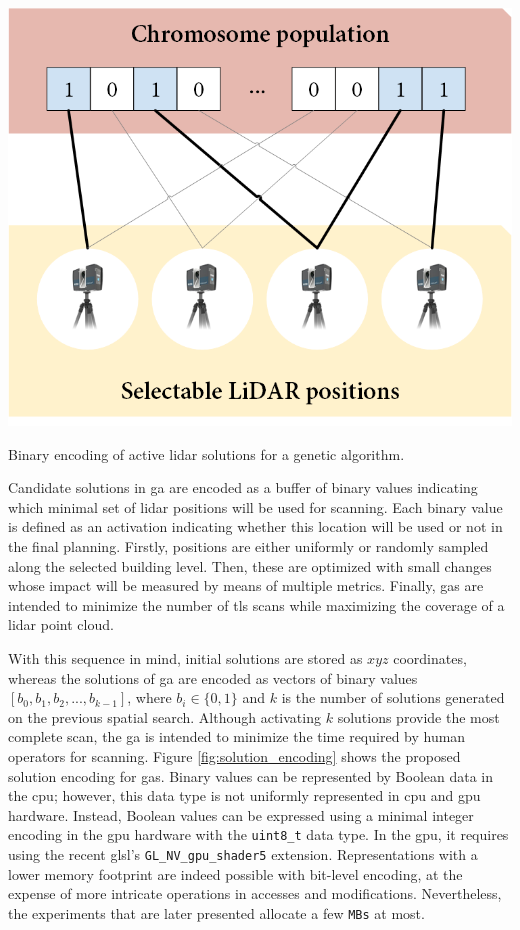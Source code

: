 \begin{marginfigure}[-2.0cm]
    \centering
    \includegraphics[width=\linewidth]{figs/lidar_optimization/solution_encoding.png}
	\caption{Binary encoding of active \acrshort{lidar} solutions for a genetic algorithm.}
	\label{fig:solution_encoding}
\end{marginfigure}
Candidate solutions in \acrshort{ga} are encoded as a buffer of binary values indicating which minimal set of \acrshort{lidar} positions will be used for scanning. Each binary value is defined as an activation indicating whether this location will be used or not in the final planning. Firstly, positions are either uniformly or randomly sampled along the selected building level. Then, these are optimized with small changes whose impact will be measured by means of multiple metrics. Finally, \acrshort{ga}s are intended to minimize the number of \acrshort{tls} scans while maximizing the coverage of a \acrshort{lidar} point cloud.

With this sequence in mind, initial solutions are stored as $xyz$ coordinates, whereas the solutions of \acrshort{ga} are encoded as vectors of binary values $[b_0, b_1, b_2, ..., b_{k-1}]$, where $b_i \in \{0, 1\}$ and $k$ is the number of solutions generated on the previous spatial search. Although activating $k$ solutions provide the most complete scan, the \acrshort{ga} is intended to minimize the time required by human operators for scanning. Figure \ref{fig:solution_encoding} shows the proposed solution encoding for \acrshort{ga}s. Binary values can be represented by Boolean data in the \acrshort{cpu}; however, this data type is not uniformly represented in \acrshort{cpu} and \acrshort{gpu} hardware. Instead, Boolean values can be expressed using a minimal integer encoding in the \acrshort{gpu} hardware with the \verb|uint8_t| data type. In the \acrshort{gpu}, it requires using the recent \acrshort{glsl}'s \verb|GL_NV_gpu_shader5| extension. Representations with a lower memory footprint are indeed possible with bit-level encoding, at the expense of more intricate operations in accesses and modifications. Nevertheless, the experiments that are later presented allocate a few \verb|MBs| at most.

